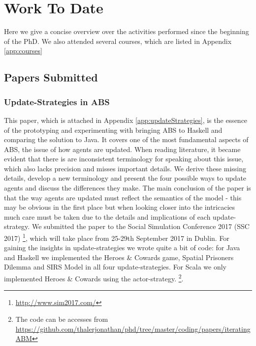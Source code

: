 \chapter{Work To Date}
\label{chap:work}


Here we give a concise overview over the activities performed since the beginning of the PhD. We also attended several courses, which are listed in Appendix \ref{app:courses}

\section{Papers Submitted}
\subsection{Update-Strategies in ABS}
This paper, which is attached in Appendix \ref{app:updateStrategies}, is the essence of the prototyping and experimenting with bringing ABS to Haskell and comparing the solution to Java. It covers one of the most fundamental aspects of ABS, the issue of how agents are updated. When reading literature, it became evident that there is are inconsistent terminology for speaking about this issue, which also lacks precision and misses important details. We derive these missing details, develop a new terminology and present the four possible ways to update agents and discuss the differences they make. The main conclusion of the paper is that the way agents are updated must reflect the semantics of the model - this may be obvious in the first place but when looking closer into the intricacies  much care must be taken due to the details and implications of each update-strategy.
We submitted the paper to the Social Simulation Conference 2017 (SSC 2017) \footnote{\url{http://www.sim2017.com/}}, which will take place from 25-29th September 2017 in Dublin.
For gaining the insights in update-strategies we wrote quite a bit of code: for Java and Haskell we implemented the Heroes \& Cowards game, Spatial Prisoners Dilemma and SIRS Model in all four update-strategies. For Scala we only implemented Heroes \& Cowards using the actor-strategy.
\footnote{The code can be accesses from \url{https://github.com/thalerjonathan/phd/tree/master/coding/papers/iteratingABM}}. 

